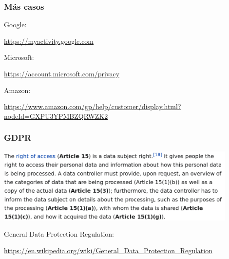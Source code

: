\begin{frame}
  \frametitle{Más casos}

  {\Large
    
    Google:

    \begin{flushright}
      \url{https://myactivity.google.com}
    \end{flushright}

    Microsoft:
    
    \begin{flushright}
    \url{https://account.microsoft.com/privacy}
    \end{flushright}

    Amazon:
    
    \begin{flushright}
      \url{https://www.amazon.com/gp/help/customer/display.html?nodeId=GXPU3YPMBZQRWZK2}
    \end{flushright}
  }
\end{frame}

\begin{frame}
  \frametitle{GDPR}

  \begin{center}
    \includegraphics[width=12cm]{figs/gdpr}
  \end{center}

  \vspace{.5cm}
  
  {\Large  
    General Data Protection Regulation:
  }

  \begin{flushright}
    {\small
      \url{https://en.wikipedia.org/wiki/General_Data_Protection_Regulation}
      }
    \end{flushright}

\end{frame}
